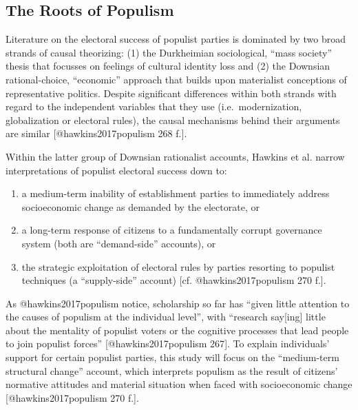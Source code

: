\documentclass[]{article}
\begin{document}
\subsection*{The Roots of Populism}\label{the-roots-of-populism}

Literature on the electoral success of populist parties is dominated by
two broad strands of causal theorizing: (1) the Durkheimian
sociological, ``mass society'' thesis that focusses on feelings of
cultural identity loss and (2) the Downsian rational-choice,
``economic'' approach that builds upon materialist conceptions of
representative politics. Despite significant differences within both
strands with regard to the independent variables that they use
(i.e.~modernization, globalization or electoral rules), the causal
mechanisms behind their arguments are similar {[}@hawkins2017populism
268 f.{]}.

\newpage

Within the latter group of Downsian rationalist accounts, Hawkins et al.
narrow interpretations of populist electoral success down to:

\begin{enumerate}
\def\labelenumi{(\alph{enumi})}
\item
  a medium-term inability of establishment parties to immediately
  address socioeconomic change as demanded by the electorate, or
\item
  a long-term response of citizens to a fundamentally corrupt governance
  system (both are ``demand-side'' accounts), or
\item
  the strategic exploitation of electoral rules by parties resorting to
  populist techniques (a ``supply-side'' account) {[}cf.
  @hawkins2017populism 270 f.{]}.
\end{enumerate}

As @hawkins2017populism notice, scholarship so far has ``given little
attention to the causes of populism at the individual level'', with
``research say{[}ing{]} little about the mentality of populist voters or
the cognitive processes that lead people to join populist forces''
{[}@hawkins2017populism 267{]}. To explain individuals' support for
certain populist parties, this study will focus on the ``medium-term
structural change'' account, which interprets populism as the result of
citizens' normative attitudes and material situation when faced with
socioeconomic change {[}@hawkins2017populism 270 f.{]}.
\end{document}
